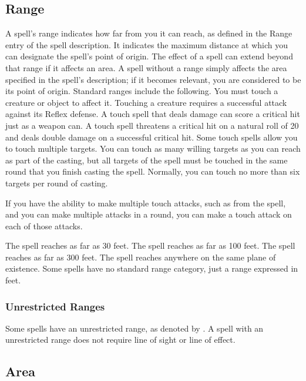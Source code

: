     \subsection{Range}
        A spell's range indicates how far from you it can reach, as defined in the Range entry of the spell description.
        It indicates the maximum distance at which you can designate the spell's point of origin.
        The effect of a spell can extend beyond that range if it affects an area.
        A spell without a range simply affects the area specified in the spell's description; if it becomes relevant, you are considered to be its point of origin.
        Standard ranges include the following.
         You must touch a creature or object to affect it.
        Touching a creature requires a successful attack against its Reflex defense.
        A touch spell that deals damage can score a critical hit just as a weapon can.
        A touch spell threatens a critical hit on a natural roll of 20 and deals double damage on a successful critical hit.
        Some touch spells allow you to touch multiple targets.
        You can touch as many willing targets as you can reach as part of the casting, but all targets of the spell must be touched in the same round that you finish casting the spell.
        Normally, you can touch no more than six targets per round of casting.

        If you have the ability to make multiple touch attacks, such as from the  spell, and you can make multiple attacks in a round, you can make a touch attack on each of those attacks.

         The spell reaches as far as 30 feet.
         The spell reaches as far as 100 feet.
         The spell reaches as far as 300 feet.
         The spell reaches anywhere on the same plane of existence.
         Some spells have no standard range category, just a range expressed in feet.

        \subsubsection{Unrestricted Ranges}

            Some spells have an unrestricted range, as denoted by \rngunrestricted.
            A spell with an unrestricted range does not require line of sight or line of effect.

    \subsection{Area}\label{Spell Area}

